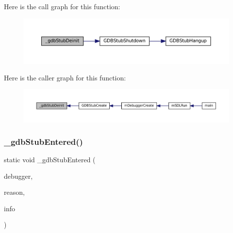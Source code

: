 Here is the call graph for this function\+:
\nopagebreak
\begin{figure}[H]
\begin{center}
\leavevmode
\includegraphics[width=350pt]{gdb-stub_8c_aff57f00e254220e5733ab7a534ab526c_cgraph}
\end{center}
\end{figure}
Here is the caller graph for this function\+:
\nopagebreak
\begin{figure}[H]
\begin{center}
\leavevmode
\includegraphics[width=350pt]{gdb-stub_8c_aff57f00e254220e5733ab7a534ab526c_icgraph}
\end{center}
\end{figure}
\mbox{\label{gdb-stub_8c_a409655c77fda26ad161b9097e7d4130e}} 
\subsubsection{\texorpdfstring{\+\_\+gdb\+Stub\+Entered()}{\_gdbStubEntered()}}
{\footnotesize\ttfamily static void \+\_\+gdb\+Stub\+Entered (\begin{DoxyParamCaption}\item[{struct m\+Debugger $\ast$}]{debugger,  }\item[{enum m\+Debugger\+Entry\+Reason}]{reason,  }\item[{struct m\+Debugger\+Entry\+Info $\ast$}]{info }\end{DoxyParamCaption})\hspace{0.3cm}{\ttfamily [static]}}

